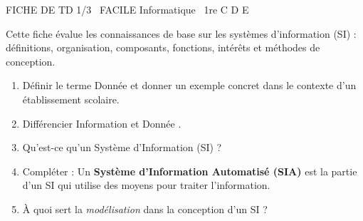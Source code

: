 \documentclass[11pt]{article}
\begin{document}
\begin{tcolorbox}[enhanced,colback=popink,colframe=popink,arc=10pt,boxrule=0pt,left=12pt,right=12pt,top=9pt,bottom=9pt]
{\color{white}\popxbold\small FICHE DE TD 1/3 \textbullet\ FACILE \hfill Informatique \textbullet\ 1re C D E\par}
\end{tcolorbox}
\vspace{4pt}
Cette fiche évalue les connaissances de base sur les systèmes d'information (SI) : définitions, organisation, composants, fonctions, intérêts et méthodes de conception.

\begin{exercice}
\begin{enumerate}
    \item Définir le terme \og Donnée \fg et donner un exemple concret dans le contexte d'un établissement scolaire.
    \item Différencier \og Information \fg et \og Donnée \fg.
    \item Qu'est-ce qu'un Système d'Information (SI) ? 
    \item Compléter : Un \textbf{Système d'Information Automatisé (SIA)} est la partie d'un SI qui utilise des moyens \underline{\hspace{4cm}} pour traiter l'information.
    \item À quoi sert la \textit{modélisation} dans la conception d'un SI ?
\end{enumerate}
\end{exercice}
\end{document}
